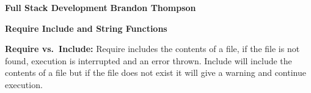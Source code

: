 \documentclass[12pt]{article}
\begin{document}
\noindent
\textbf{Full Stack Development} \hfill \textbf{Brandon Thompson} \\

\begin{center}
\textbf{Require Include and String Functions}
\end{center}
{\bf Require vs.\ Include:} Require includes the contents of a file, if the file is not found, execution is interrupted and an error thrown. Include will include the contents of a file but if the file does not exist it will give a warning and continue execution.
\end{document}
